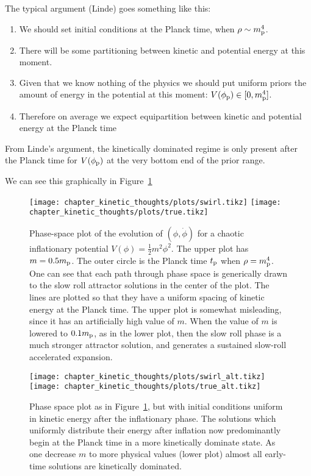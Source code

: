 The typical argument (Linde) goes something like this:

\begin{enumerate}
  \item We should set initial conditions at the Planck time, when
    $\rho\sim m_{\mathrm{p}}^4$.
  \item There will be some partitioning between kinetic and potential
    energy at this moment.
  \item Given that we know nothing of the physics we should put
    uniform priors the amount of energy in the potential at this
    moment: $V(\phi_{\mathrm{p}})\in[0,m_{\mathrm{p}}^4]$.
  \item Therefore on average we expect equipartition between kinetic
    and potential energy at the Planck time
\end{enumerate}

From Linde's argument, the kinetically dominated regime is only present
after the Planck time for $V(\phi_{\mathrm{p}})$ at the very bottom end of the
prior range.

We can see this graphically in Figure~\ref{fig:kt:linde}

\ifdefined\lightweight{}
\else
\begin{figure}[tp]
  \centering
  \texttt{[image: chapter\_kinetic\_thoughts/plots/swirl.tikz]}
  \texttt{[image: chapter\_kinetic\_thoughts/plots/true.tikz]}
  \caption{Phase-space plot of the evolution of $(\phi,\dot{\phi})$ for a chaotic inflationary potential $V(\phi) = \frac{1}{2}m^2 \phi^2$. The upper plot has $m=0.5m_{\mathrm{p}}$. The outer circle is the Planck time $t_{\mathrm{p}}$ when $\rho=m_{\mathrm{p}}^4$. One can see that each path through phase space is generically drawn to the slow roll attractor solutions in the center of the plot. The lines are plotted so that they have a uniform spacing of kinetic energy at the Planck time.
  The upper plot is somewhat misleading, since it has an artificially high value of $m$. When the value of $m$ is lowered to $0.1m_{\mathrm{p}}$, as in the lower plot, then the slow roll phase is a much stronger attractor solution, and generates a sustained slow-roll accelerated expansion.\label{fig:kt:linde}}
\end{figure}

\begin{figure}[tp]
  \centering
  \texttt{[image: chapter\_kinetic\_thoughts/plots/swirl\_alt.tikz]}
  \texttt{[image: chapter\_kinetic\_thoughts/plots/true\_alt.tikz]}
  \caption{Phase space plot as in Figure~\protect\ref{fig:kt:linde}, but with initial conditions uniform in kinetic energy after the inflationary phase. The solutions which uniformly distribute their energy after inflation now predominantly begin at the Planck time in a more kinetically dominate state. As one decrease $m$ to more physical values (lower plot) almost all early-time solutions are kinetically dominated.\label{fig:kt:b4infl}}
\end{figure}
\fi




